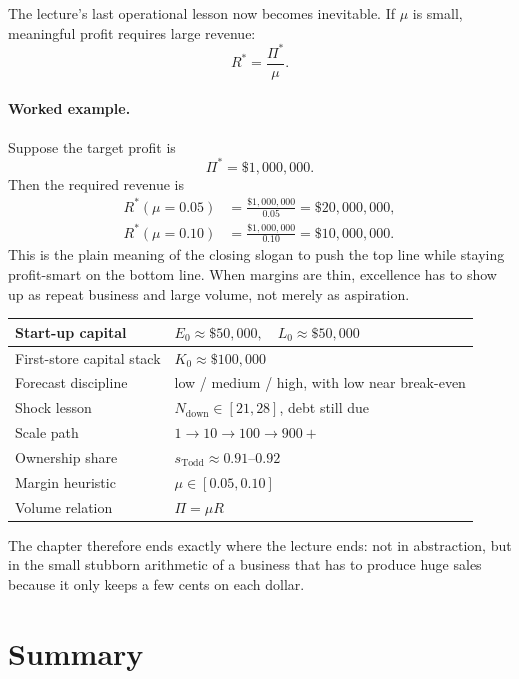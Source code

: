 The lecture's last operational lesson now becomes inevitable. If \(\mu\) is small, meaningful profit requires large revenue:
\begin{equation}
R^* = \frac{\Pi^*}{\mu}.
\end{equation}

\paragraph{Worked example.}
Suppose the target profit is
\[
\Pi^* = \$1{,}000{,}000.
\]
Then the required revenue is
\begin{align}
R^*(\mu=0.05) &= \frac{\$1{,}000{,}000}{0.05} = \$20{,}000{,}000,\\
R^*(\mu=0.10) &= \frac{\$1{,}000{,}000}{0.10} = \$10{,}000{,}000.
\end{align}
This is the plain meaning of the closing slogan to push the top line while staying profit-smart on the bottom line. When margins are thin, excellence has to show up as repeat business and large volume, not merely as aspiration.

\begin{table}[h]
\centering
\begin{tabular}{|l|l|}
\hline
Start-up capital & \(E_0\approx \$50{,}000,\quad L_0\approx \$50{,}000\) \\
\hline
First-store capital stack & \(K_0\approx \$100{,}000\) \\
\hline
Forecast discipline & low / medium / high, with low near break-even \\
\hline
Shock lesson & \(N_{\mathrm{down}}\in[21,28]\), debt still due \\
\hline
Scale path & \(1\to 10\to 100\to 900+\) \\
\hline
Ownership share & \(s_{\mathrm{Todd}}\approx 0.91\text{--}0.92\) \\
\hline
Margin heuristic & \(\mu\in[0.05,0.10]\) \\
\hline
Volume relation & \(\Pi=\mu R\) \\
\hline
\end{tabular}
\end{table}

The chapter therefore ends exactly where the lecture ends: not in abstraction, but in the small stubborn arithmetic of a business that has to produce huge sales because it only keeps a few cents on each dollar.

\section{Summary}

